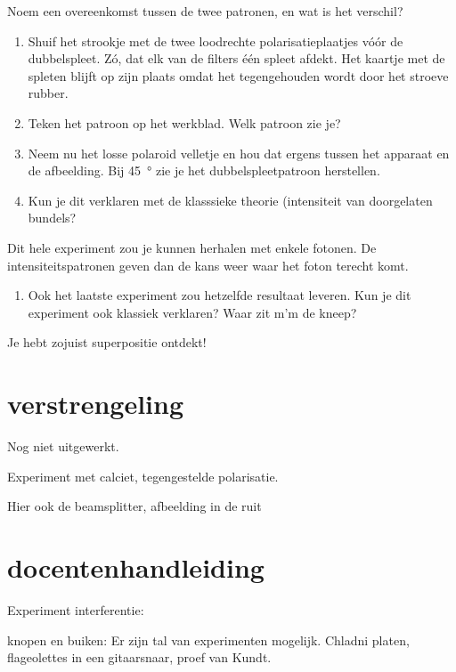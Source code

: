 \documentclass[../../main.tex]{subfiles}
\begin{document}
\easy Noem een overeenkomst tussen de twee patronen, en wat is het verschil? 
\begin{enumerate}
\item Shuif het strookje met de twee loodrechte polarisatieplaatjes v\'o\'or de dubbelspleet. Z\'o, dat elk van de filters \'e\'en spleet afdekt.
Het kaartje met de spleten blijft op zijn plaats omdat het tegengehouden wordt door het stroeve rubber.
\item Teken het patroon op het werkblad. Welk patroon zie je? 
\item Neem nu het losse polaroid velletje en hou dat ergens tussen het apparaat en de afbeelding. Bij \SI{45}{\degree} zie je het dubbelspleetpatroon herstellen. 
\item Kun je dit verklaren met de klasssieke theorie (intensiteit van doorgelaten bundels?
\end{enumerate}
Dit hele experiment zou je kunnen herhalen met enkele fotonen. De intensiteitspatronen geven dan de kans weer waar het foton terecht komt.
\begin{enumerate}
\item Ook het laatste experiment zou hetzelfde resultaat leveren. Kun je dit experiment ook klassiek verklaren? Waar zit m'm de kneep? 
\end{enumerate}

Je hebt zojuist superpositie ontdekt!

\section{verstrengeling}
Nog niet uitgewerkt.

Experiment met calciet, tegengestelde polarisatie.

Hier ook de beamsplitter, afbeelding in de ruit

\newpage
\section{docentenhandleiding}
Experiment interferentie:

knopen en buiken:
Er zijn tal van experimenten mogelijk. Chladni platen, flageolettes in een gitaarsnaar, proef van Kundt.
\end{document}

